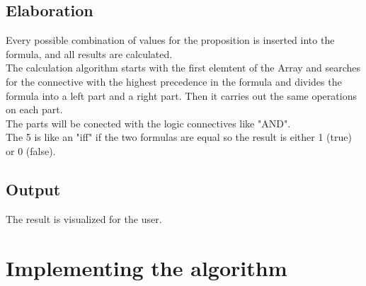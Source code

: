\documentclass[11pt, a4paper, titlepage, block]{article}
\begin{document}
	\subsection{Elaboration}
	Every possible combination of values for the proposition is inserted into the formula, and all results are calculated.\\
	The calculation algorithm starts with the first elemtent of the Array and searches for the connective with the highest precedence  in the formula and divides the formula into a left part and a right part. Then it carries out the same operations on each part.\\
	The parts will be conected with the logic connectives like "AND". \\
	The 5 is like an "iff" if the two formulas are equal so the result is either 1 (true) or 0 (false). 
	\subsection{Output}
	The result is visualized for the user.
	\newpage
\section{Implementing the algorithm}
	\lstset{numbers=left, tabsize=2,breaklines=true, language=C}
	

	\newpage
\end{document}

